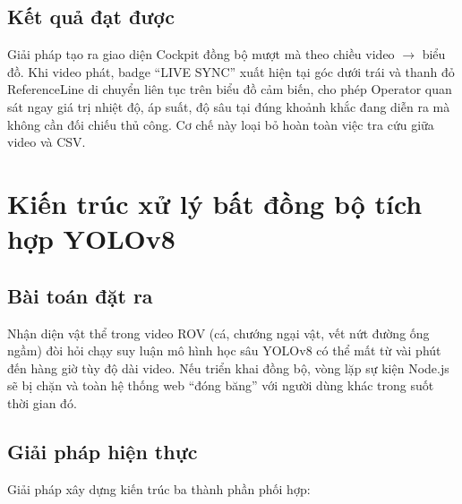 \documentclass[../DoAn.tex]{subfiles}
\begin{document}
\subsection{Kết quả đạt được}

Giải pháp tạo ra giao diện Cockpit đồng bộ mượt mà theo chiều video $\to$ biểu đồ. Khi video phát, badge ``LIVE SYNC'' xuất hiện tại góc dưới trái và thanh đỏ ReferenceLine di chuyển liên tục trên biểu đồ cảm biến, cho phép Operator quan sát ngay giá trị nhiệt độ, áp suất, độ sâu tại đúng khoảnh khắc đang diễn ra mà không cần đối chiếu thủ công. Cơ chế này loại bỏ hoàn toàn việc tra cứu giữa video và CSV.

\section{Kiến trúc xử lý bất đồng bộ tích hợp YOLOv8}
\label{section:7.6}

\subsection{Bài toán đặt ra}

Nhận diện vật thể trong video ROV (cá, chướng ngại vật, vết nứt đường ống ngầm) đòi hỏi chạy suy luận mô hình học sâu YOLOv8 có thể mất từ vài phút đến hàng giờ tùy độ dài video. Nếu triển khai đồng bộ, vòng lặp sự kiện Node.js sẽ bị chặn và toàn hệ thống web ``đóng băng'' với người dùng khác trong suốt thời gian đó.

\subsection{Giải pháp hiện thực}

Giải pháp xây dựng kiến trúc ba thành phần phối hợp:
\end{document}
